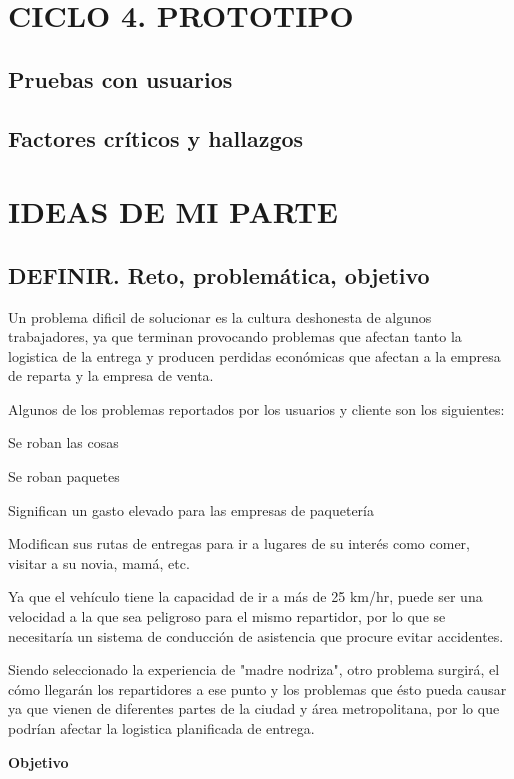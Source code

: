 \documentclass[12pt,letterpaper]{book}
\begin{document}
\newpage

\chapter{CICLO 4. PROTOTIPO}
\section{Pruebas con usuarios}
\section{Factores críticos y hallazgos}

\newpage

\chapter{IDEAS DE MI PARTE}
\section{DEFINIR. Reto, problemática, objetivo}

Un problema dificil de solucionar es la cultura deshonesta de algunos trabajadores, ya que terminan provocando problemas que afectan tanto la logistica de la entrega y producen perdidas económicas que afectan a la empresa de reparta y la empresa de venta.

Algunos de los problemas reportados por los usuarios y cliente son los siguientes:

Se roban las cosas

Se roban paquetes

Significan un gasto elevado para las empresas de paquetería

Modifican sus rutas de entregas para ir a lugares de su interés como comer, visitar a su novia, mamá, etc.

Ya que el vehículo tiene la capacidad de ir a más de 25 km/hr, puede ser una velocidad a la que sea peligroso para el mismo repartidor, por lo que se necesitaría un sistema de conducción de asistencia que procure evitar accidentes.

Siendo seleccionado la experiencia de "madre nodriza", otro problema surgirá, el cómo llegarán los repartidores a ese punto y los problemas que ésto pueda causar ya que vienen de diferentes partes de la ciudad y área metropolitana, por lo que podrían afectar la logistica planificada de entrega.

\textbf{Objetivo}
\end{document}
